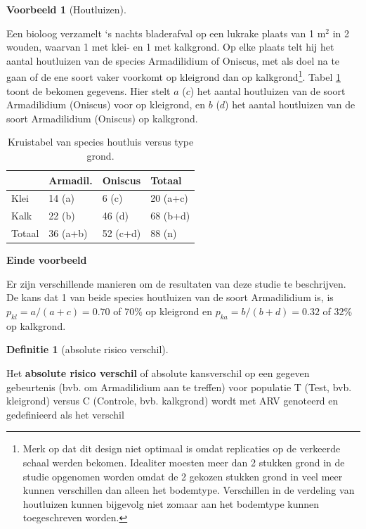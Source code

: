 \documentclass[
  12pt,dutch,coursenotes]{book}
\theoremstyle{definition}
\newtheorem{definition}{Definitie}[chapter]
\theoremstyle{definition}
\newtheorem{example}{Voorbeeld}[chapter]
\theoremstyle{definition}
\theoremstyle{definition}
\theoremstyle{remark}
\begin{document}
\begin{example}[Houtluizen]
\protect\hypertarget{exm:unnamed-chunk-109}{}{\label{exm:unnamed-chunk-109} {} }
\end{example}

Een bioloog verzamelt `s nachts bladerafval op een lukrake plaats van 1 m\(^2\)
in 2 wouden, waarvan 1 met klei- en 1 met kalkgrond. Op elke plaats telt hij het aantal houtluizen van de species
Armadilidium of Oniscus, met als doel na te gaan of de ene soort vaker voorkomt op kleigrond dan op
kalkgrond\footnote{Merk op dat dit design niet optimaal is omdat replicaties op de verkeerde schaal werden bekomen. Idealiter moesten meer dan 2 stukken grond in de studie opgenomen worden omdat de 2 gekozen stukken grond in veel meer kunnen verschillen dan alleen het bodemtype. Verschillen in de verdeling van houtluizen kunnen bijgevolg niet zomaar aan het bodemtype kunnen toegeschreven worden.}. Tabel \ref{tab:cox} toont de bekomen gegevens. Hier stelt \(a\) (\(c\)) het aantal houtluizen van de soort Armadilidium (Oniscus) voor op kleigrond, en \(b\) (\(d\)) het aantal houtluizen van de soort Armadilidium (Oniscus) op kalkgrond.

\begin{table}

\caption{\label{tab:cox}Kruistabel van species houtluis versus type grond.}
\centering
\begin{tabular}[t]{llll}
\toprule
  & Armadil. & Oniscus & Totaal\\
\midrule
Klei & 14 (a) & 6 (c) & 20 (a+c)\\
Kalk & 22 (b) & 46 (d) & 68 (b+d)\\
Totaal & 36 (a+b) & 52 (c+d) & 88 (n)\\
\bottomrule
\end{tabular}
\end{table}

\textbf{Einde voorbeeld}

Er zijn verschillende manieren om de resultaten van deze studie te
beschrijven. De kans dat 1 van beide species houtluizen van de soort Armadilidium is, is \(p_{kl}=a/(a+c)=0.70\) of 70\% op kleigrond en \(p_{ka}=b/(b+d)=0.32\) of 32\% op kalkgrond.

\begin{definition}[absolute risico verschil]
\protect\hypertarget{def:unnamed-chunk-110}{}{\label{def:unnamed-chunk-110} {} }
\end{definition}
Het \textbf{absolute risico verschil} of absolute kansverschil op een gegeven gebeurtenis (bvb. om Armadilidium aan te treffen) voor populatie T (Test, bvb. kleigrond) versus C (Controle, bvb. kalkgrond) wordt
met ARV genoteerd en gedefinieerd als het verschil
\end{document}
